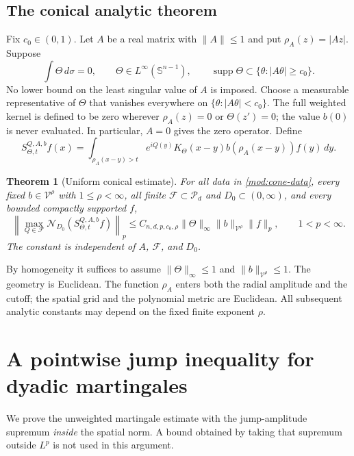 \documentclass[11pt]{article}
\numberwithin{equation}{section}
\newtheorem{theorem}{Theorem}[section]
\theoremstyle{remark}
\theoremstyle{definition}
\newcommand{\Sph}{\mathbb S}
\newcommand{\NN}{\mathcal N}
\newcommand{\PP}{\mathcal P}
\begin{document}
\subsection{The conical analytic theorem}
Fix $c_0\in(0,1)$. Let $A$ be a real matrix with $\|A\|\le1$ and put
$\rho_A(z)=|Az|$. Suppose
\begin{equation}\label{mod:cone-data}
 \int\Theta\,d\sigma=0,\qquad \Theta\in L^\infty(\Sph^{n-1}),\qquad
 \operatorname{supp}\Theta\subset\{\theta:|A\theta|\ge c_0\}.
\end{equation}
No lower bound on the least singular value of $A$ is imposed. Choose
a measurable representative of $\Theta$ that vanishes everywhere on
$\{\theta:|A\theta|<c_0\}$. The full weighted kernel is defined to be
zero wherever $\rho_A(z)=0$ or $\Theta(z')=0$; the value $b(0)$ is
never evaluated. In particular, $A=0$ gives the zero operator. Define
\[
 S^{Q,A,b}_{\Theta,t}f(x)
 =\int_{\rho_A(x-y)>t}e^{iQ(y)}K_\Theta(x-y)
       b(\rho_A(x-y))f(y)\,dy.
\]
\begin{theorem}[Uniform conical estimate]\label{mod:cone}
For all data in \eqref{mod:cone-data}, every fixed
$b\in\mathcal V^\rho$ with $1\le\rho<\infty$, all finite
$\mathcal F\subset\PP_d$ and $D_0\subset(0,\infty)$, and every
bounded compactly supported $f$,
\begin{equation}\label{mod:cone-bound}
 \left\|\max_{Q\in\mathcal F}\NN_{D_0}(S^{Q,A,b}_{\Theta,t}f)\right\|_p
 \le C_{n,d,p,c_0,\rho}\|\Theta\|_\infty
       \|b\|_{\mathcal V^\rho}\|f\|_p,
 \qquad1<p<\infty.
\end{equation}
The constant is independent of $A$, $\mathcal F$, and $D_0$.
\end{theorem}
By homogeneity it suffices to assume
$\|\Theta\|_\infty\le1$ and $\|b\|_{\mathcal V^\rho}\le1$.
The geometry is Euclidean. The function $\rho_A$ enters both the
radial amplitude and the cutoff; the spatial grid and the polynomial
metric are Euclidean. All subsequent analytic constants may depend on
the fixed finite exponent $\rho$.




\section{A pointwise jump inequality for dyadic martingales}
\label{mod:sec-martingale-pointwise}

We prove the unweighted martingale estimate with the jump-amplitude
supremum \emph{inside} the spatial norm. A bound obtained by taking
that supremum outside $L^p$ is not used in this argument.
\end{document}
